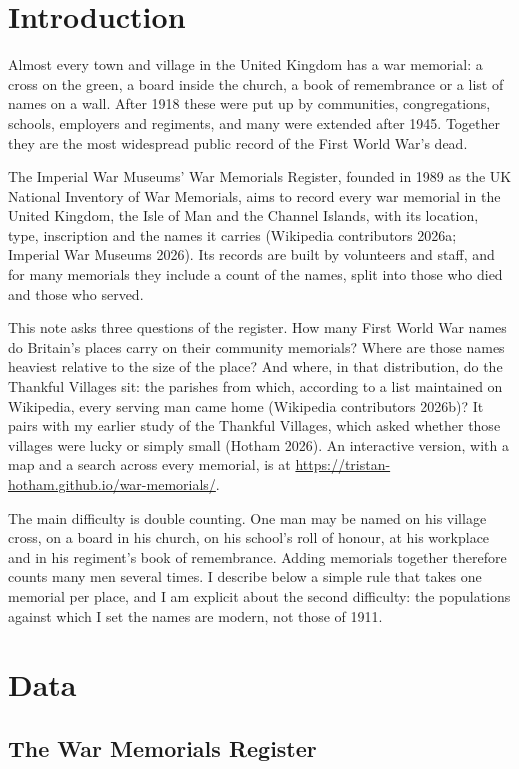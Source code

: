 \documentclass[11pt,a4paper]{article}
\begin{document}
\section{Introduction}

Almost every town and village in the United Kingdom has a war memorial: a cross on the green, a board inside the church, a book of remembrance or a list of names on a wall. After 1918 these were put up by communities, congregations, schools, employers and regiments, and many were extended after 1945. Together they are the most widespread public record of the First World War's dead.

The Imperial War Museums' War Memorials Register, founded in 1989 as the UK National Inventory of War Memorials, aims to record every war memorial in the United Kingdom, the Isle of Man and the Channel Islands, with its location, type, inscription and the names it carries (Wikipedia contributors 2026a; Imperial War Museums 2026). Its records are built by volunteers and staff, and for many memorials they include a count of the names, split into those who died and those who served.

This note asks three questions of the register. How many First World War names do Britain's places carry on their community memorials? Where are those names heaviest relative to the size of the place? And where, in that distribution, do the Thankful Villages sit: the parishes from which, according to a list maintained on Wikipedia, every serving man came home (Wikipedia contributors 2026b)? It pairs with my earlier study of the Thankful Villages, which asked whether those villages were lucky or simply small (Hotham 2026). An interactive version, with a map and a search across every memorial, is at \url{https://tristan-hotham.github.io/war-memorials/}.

The main difficulty is double counting. One man may be named on his village cross, on a board in his church, on his school's roll of honour, at his workplace and in his regiment's book of remembrance. Adding memorials together therefore counts many men several times. I describe below a simple rule that takes one memorial per place, and I am explicit about the second difficulty: the populations against which I set the names are modern, not those of 1911.

\section{Data}

\subsection{The War Memorials Register}
\end{document}

